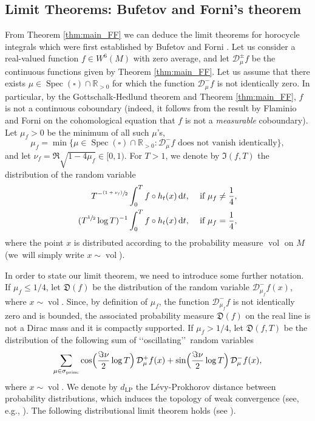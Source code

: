 \documentclass[10pt]{amsart}
\newcommand{\psfrac}[2]{\sfrac{(#1)}{#2}}
\newcommand \R{\mathbb{R}}
\newcommand*{\diff}{\mathop{}\!\mathrm{d}}
\newcommand{\Dp}[1]{\mathcal{D}_\mu^{+} #1}
\newcommand{\Dm}[1]{\mathcal{D}_\mu^{-} #1}
\newcommand{\Dpm}[1]{\mathcal{D}_\mu^{\pm} #1}
\newcommand{\Levy}{d_{\levyy}}
\DeclareMathOperator{\vol}{vol}
\DeclareMathOperator{\Spec}{Spec}
\DeclareMathOperator{\princ}{princ}
\DeclareMathOperator{\levyy}{LP}
\theoremstyle{definition}
\begin{document}
\subsection{Limit Theorems: Bufetov and Forni's theorem}

From Theorem \ref{thm:main_FF} we can deduce the limit theorems for horocycle integrals which were first established by Bufetov and Forni \cite{BuFo}.
Let us consider a real-valued function $f \in W^6(M)$ with zero average, and let $\Dpm{f}$ be the continuous functions given by Theorem \ref{thm:main_FF}.
Let us assume that there exists $\mu \in \Spec(\square) \cap \R_{>0}$ for which the function $\Dm{f}$ is not identically zero. In particular, by the Gottschalk-Hedlund theorem and Theorem \ref{thm:main_FF}, $f$ is not a continuous coboundary (indeed, it follows from the result by Flaminio and Forni \cite{FlaFo} on the cohomological equation that $f$ is not a \emph{measurable} coboundary).
Let $\mu_f >0$ be the minimum of all such $\mu$'s, \ie
\[
\mu_f = \min \{ \mu \in \Spec(\square) \cap \R_{>0} : \Dm{f} \text{ does not vanish identically}\},
\]
and let $\nu_f = \Re \sqrt{1-4\mu_f} \in [0,1)$.
For $T >1$, we denote by $\mathfrak{I}(f,T)$ the distribution of the random variable
\begin{equation*}
\begin{split}
T^{- \psfrac{1+\nu_f}{2}}\int_0^T f \circ h_t (x) \diff t, &\quad \text{ if } \mu_f \neq \frac{1}{4},\\
(T^{\sfrac{1}{2}} \log T)^{-1} \int_0^T f \circ h_t (x) \diff t, &\quad \text{ if } \mu_f = \frac{1}{4},
\end{split}
\end{equation*}
where the point $x$ is distributed according to the probability measure $\vol$ on $M$ (we~will simply write $x \sim \vol$).

In order to state our limit theorem, we need to introduce some further notation.
If $\mu_f \leq 1/4$, let $\mathfrak{D}(f)$ be the distribution of the random variable $\mathcal{D}^{-}_{\mu_f}f(x)$, where $x \sim \vol$.
Since, by definition of $\mu_f$, the function $\mathcal{D}^{-}_{\mu_f}f$ is not identically zero and is bounded, the associated probability measure $\mathfrak{D}(f)$ on the real line is not a Dirac mass and it is compactly supported.
If $\mu_f > 1/4$, let $\mathfrak{D}(f,T)$ be the distribution of the following sum of \lq\lq oscillating\rq\rq\ random variables
\[
\sum_{\mu \in \sigma_{\princ}} \cos\Bigl(\frac{\Im\nu}{2} \log T \Bigr) \, \Dp{ f(x)} + \sin\Bigl(\frac{\Im\nu}{2} \log T \Bigr) \, \Dm{ f(x)},
\]
where $x \sim \vol$. We denote by $\Levy$ the Lévy-Prokhorov distance between probability distributions, which induces the topology of weak convergence (see, e.g., \cite{Bil}).
The following distributional limit theorem holds (see \cite[Th.\,1.4, 1.5]{BuFo}).
\end{document}
